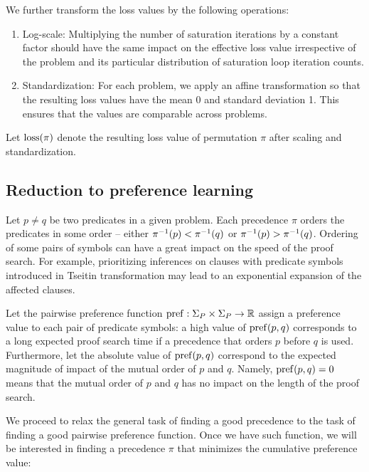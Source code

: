 We further transform the loss values by the following operations:

\begin{enumerate}
	\item Log-scale: Multiplying the number of saturation iterations by a constant factor
	should have the same impact on the effective loss value
	irrespective of the problem and its particular distribution of saturation loop iteration counts.
	\item Standardization\cite{?}: For each problem,
	we apply an affine transformation so that the resulting loss values
	have the mean 0 and standard deviation 1.
	This ensures that the values are comparable across problems.
\end{enumerate}

Let \(\operatorname{loss}(\pi)\) denote the resulting loss value of permutation \(\pi\)
after scaling and standardization.

\subsection{Reduction to preference learning}

Let \(p \neq q\) be two predicates in a given \gls{problem}.
Each precedence \(\pi\) orders the predicates in some order --
either \(\pi^{-1}(p) < \pi^{-1}(q)\) or \(\pi^{-1}(p) > \pi^{-1}(q)\).
Ordering of some pairs of symbols can have a great impact on the speed of the proof search.
For example, prioritizing inferences on clauses with predicate symbols
introduced in Tseitin transformation
may lead to an exponential expansion of the affected clauses.

Let the pairwise preference
function \(\operatorname{pref} : \Sigma_P \times \Sigma_P \rightarrow \operatorname{\mathbb{R}}\)
assign a preference value to each pair of predicate symbols:
a high value of \(\operatorname{pref}(p, q)\) corresponds to a long expected proof search time
if a precedence that orders \(p\) before \(q\) is used.
Furthermore, let the absolute value of \(\operatorname{pref}(p, q)\)
correspond to the expected magnitude of impact of the mutual order of \(p\) and \(q\).
Namely, \(\operatorname{pref}(p, q) = 0\) means that the mutual order of \(p\) and \(q\)
has no impact on the length of the proof search.

We proceed to relax the general task of finding a good precedence
to the task of finding a good pairwise preference function.
Once we have such function,
we will be interested in finding a precedence \(\pi\) that minimizes the cumulative preference value:

